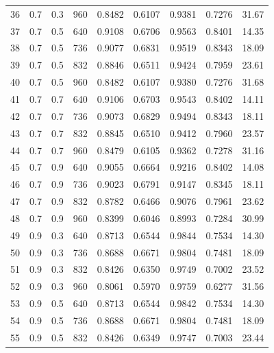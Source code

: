 \begin{table}[H]
{\begin{tabular}{ccccccccc}
        36 & 0.7 & 0.3 & 960 & 0.8482  & 0.6107  & 0.9381  & 0.7276  & 31.67   \\ 
        37 & 0.7 & 0.5 & 640 & 0.9108  & 0.6706  & 0.9563  & 0.8401  & 14.35   \\ 
        \rowcolor{gray!10}
        38 & 0.7 & 0.5 & 736 & 0.9077  & 0.6831  & 0.9519  & 0.8343  & 18.09   \\ 
        39 & 0.7 & 0.5 & 832 & 0.8846  & 0.6511  & 0.9424  & 0.7959  & 23.61   \\ 
        \rowcolor{gray!10}
        40 & 0.7 & 0.5 & 960 & 0.8482  & 0.6107  & 0.9380  & 0.7276  & 31.68   \\ 
        41 & 0.7 & 0.7 & 640 & 0.9106  & 0.6703  & 0.9543  & 0.8402  & 14.11   \\ 
        \rowcolor{gray!10}
        42 & 0.7 & 0.7 & 736 & 0.9073  & 0.6829  & 0.9494  & 0.8343  & 18.11   \\ 
        43 & 0.7 & 0.7 & 832 & 0.8845  & 0.6510  & 0.9412  & 0.7960  & 23.57   \\ 
        \rowcolor{gray!10}
        44 & 0.7 & 0.7 & 960 & 0.8479  & 0.6105  & 0.9362  & 0.7278  & 31.16   \\ 
        45 & 0.7 & 0.9 & 640 & 0.9055  & 0.6664  & 0.9216  & 0.8402  & 14.08   \\ 
        \rowcolor{gray!10}
        46 & 0.7 & 0.9 & 736 & 0.9023  & 0.6791  & 0.9147  & 0.8345  & 18.11   \\ 
        47 & 0.7 & 0.9 & 832 & 0.8782  & 0.6466  & 0.9076  & 0.7961  & 23.62   \\ 
        \rowcolor{gray!10}
        48 & 0.7 & 0.9 & 960 & 0.8399  & 0.6046  & 0.8993  & 0.7284  & 30.99   \\ 
        49 & 0.9 & 0.3 & 640 & 0.8713  & 0.6544  & 0.9844  & 0.7534  & 14.30   \\ 
        \rowcolor{gray!10}
        50 & 0.9 & 0.3 & 736 & 0.8688  & 0.6671  & 0.9804  & 0.7481  & 18.09   \\ 
        51 & 0.9 & 0.3 & 832 & 0.8426  & 0.6350  & 0.9749  & 0.7002  & 23.52   \\ 
        \rowcolor{gray!10}
        52 & 0.9 & 0.3 & 960 & 0.8061  & 0.5970  & 0.9759  & 0.6277  & 31.56   \\ 
        53 & 0.9 & 0.5 & 640 & 0.8713  & 0.6544  & 0.9842  & 0.7534  & 14.30   \\ 
        \rowcolor{gray!10}
        54 & 0.9 & 0.5 & 736 & 0.8688  & 0.6671  & 0.9804  & 0.7481  & 18.09   \\ 
        55 & 0.9 & 0.5 & 832 & 0.8426  & 0.6349  & 0.9747  & 0.7003  & 23.44   \\ 

\end{tabular}}
\end{table}

